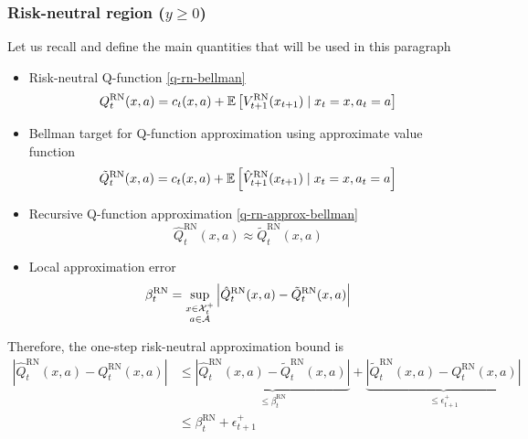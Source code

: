 \subsubsection{Risk-neutral region ($y \geq 0$)}
\label{theory:rn-error}

Let us recall and define the main quantities that will be used in this paragraph
\begin{itemize}
	\item Risk-neutral Q-function \eqref{q-rn-bellman}
	\begin{equation*}
		Q_t^{\text{RN}}(x, a) = c_t(x, a) + \mathbb{E} \left[ V_{t+1}^{\text{RN}} (x_{t+1}) \mid x_t = x, a_t = a \right]
	\end{equation*}
	\item Bellman target for Q-function approximation using approximate value function
	\begin{equation*}
		\tilde{Q}_t^{\text{RN}}(x, a) =  c_t(x, a) + \mathbb{E} \left[ \hat{V}_{t+1}^{\text{RN}}(x_{t+1}) \mid x_t = x, a_t = a \right]
	\end{equation*}
	\item Recursive Q-function approximation \eqref{q-rn-approx-bellman}
	\begin{equation*}
		\hat{Q}_t^{\text{RN}}(x, a) \approx \tilde{Q}_t^{\text{RN}}(x, a)
	\end{equation*}
	\item Local approximation error
	\begin{equation*}
		\beta_t^{\text{RN}} = \sup_{\substack{x \in \mathcal{X}_t^+ \\ a \in \mathcal{A}}} \left| \hat{Q}_t^{\text{RN}}(x, a) - \tilde{Q}_t^{\text{RN}}(x, a) \right|
	\end{equation*}
\end{itemize}

Therefore, the one-step risk-neutral approximation bound is
\begin{equation}
	\begin{array}{rl}
		\left| \hat{Q}_t^{\text{RN}}(x, a) - Q_t^{\text{RN}}(x, a) \right| & \leq \underbrace{\left| \hat{Q}_t^{\text{RN}}(x, a) - \tilde{Q}_t^{\text{RN}}(x, a) \right|}_{\leq \beta_t^{\text{RN}}} + \underbrace{\left| \tilde{Q}_t^{\text{RN}}(x, a) - Q_t^{\text{RN}}(x, a) \right|}_{\leq \epsilon_{t+1}^+} \\
		& \leq \beta_t^{\text{RN}} + \epsilon_{t+1}^+
	\end{array}
	\label{one-step-bound-rn}
\end{equation}

